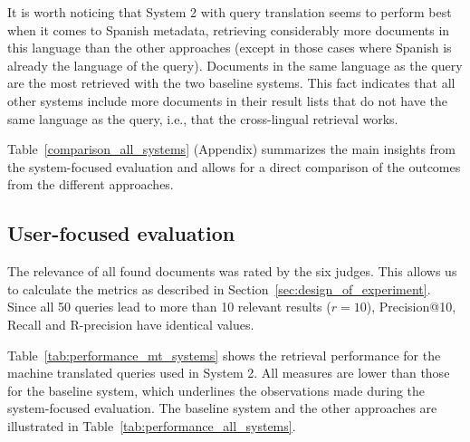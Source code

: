 \documentclass[a4paper,11pt]{article}
\begin{document}
It is worth noticing that System 2 with query translation seems to perform best when it comes to Spanish metadata, retrieving considerably more documents in this language than the other approaches (except in those cases where Spanish is already the language of the query). Documents in the same language as the query are the most retrieved with the two baseline systems. This fact indicates that all other systems include more documents in their result lists that do not have the same language as the query, i.e., that the cross-lingual retrieval works.



Table~\ref{comparison_all_systems} (Appendix) summarizes the main insights from the system-focused evaluation and allows for a direct comparison of the outcomes from the different approaches.












\subsection{User-focused evaluation}
\label{results}
The relevance of all found documents was rated by the six judges. This allows us to calculate the metrics as described in Section~\ref{sec:design_of_experiment}. Since all 50 queries lead to more than 10 relevant results ($r = 10$), Precision@10, Recall and R-precision have identical values.

Table~\ref{tab:performance_mt_systems} shows the retrieval performance for the machine translated queries used in System 2. All measures are lower than those for the baseline system, which underlines the observations made during the system-focused evaluation. The baseline system and the other approaches are illustrated in Table~\ref{tab:performance_all_systems}.
\end{document}
